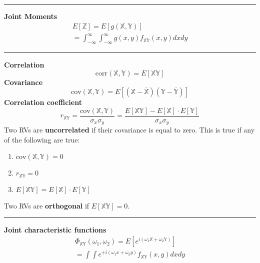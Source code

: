 \documentclass{article}
\providecommand{\X}{\mathbb{X}}
\providecommand{\Y}{\mathbb{Y}}
\providecommand{\Z}{\mathbb{Z}}
\begin{document}
\begin{multicols*}{3}
        \noindent\rule{\columnwidth}{0.4pt}

        \textbf{Joint Moments}
        \begin{equation*}
            \begin{gathered}
                E[\Z] = E[g(\X,\Y)]\\
                = \int_{-\infty}^{\infty} \int_{-\infty}^{\infty}  g(x,y)f_{\X\Y}(x,y)dxdy
            \end{gathered}
        \end{equation*}

        \noindent\rule{\columnwidth}{0.4pt}

        \textbf{Correlation}
        \begin{equation*}
            \text{corr}(\X,\Y)=E[\X\Y]
        \end{equation*}
        \textbf{Covariance}
        \begin{equation*}
            \text{cov}(\X,\Y)=E[(\X-\overline{\X})(\Y-\overline{\Y})]
        \end{equation*}
        \textbf{Correlation coefficient}
        \begin{equation*}
            r_{\X\Y} = \frac{\text{cov}(\X,\Y)}{\sigma_x \sigma_y} = \frac{E[\X\Y]-E[\X]\cdot E[\Y]}{\sigma_x\sigma_y}
        \end{equation*}
        Two RVs are \textbf{uncorrelated} if their covariance is equal to zero.
        This is true if any of the following are true:
        \begin{enumerate}
            \item $\text{cov}(\X,\Y) = 0$
            \item $r_{\X\Y}=0$
            \item $E[\X\Y] = E[\X] \cdot E[\Y]$
        \end{enumerate}
        Two RVs are \textbf{orthogonal} if $E[\X\Y] = 0$.

        \noindent\rule{\columnwidth}{0.4pt}

        \textbf{Joint characteristic functions}
        \begin{equation*}
            \begin{gathered}
                \Phi_{\X\Y}(\omega_1,\omega_2) = E[e^{i(\omega_1\X+\omega_2\Y)}]\\
                = \int \int e^{+i(\omega_1 x+\omega_2 y)}f_{\X\Y}(x,y)dxdy
            \end{gathered}
        \end{equation*}


\end{multicols*}
\end{document}
